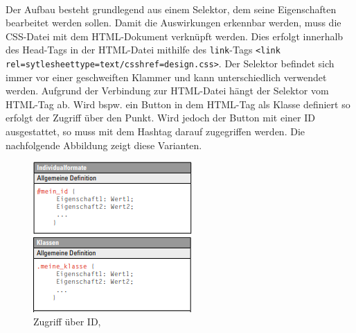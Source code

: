 \documentclass[a4paper,titlepage,halfparskip,12pt]{scrreprt}
\begin{document}
\begin{onehalfspacing}
\\Der Aufbau besteht grundlegend aus einem Selektor, dem seine Eigenschaften bearbeitet werden sollen. Damit die Auswirkungen erkennbar werden, muss die \ac{CSS}-Datei mit dem HTML-Dokument verknüpft werden. Dies erfolgt innerhalb des Head-Tags in der \ac{HTML}-Datei mithilfe des \texttt{link}-Tags \texttt{<link rel=\dq sytlesheet\dq \;type=\dq text/css\dq \;href=\dq design.css\dq>}. Der Selektor befindet sich immer vor einer geschweiften Klammer und kann unterschiedlich verwendet werden. Aufgrund der Verbindung zur HTML-Datei hängt der Selektor vom \ac{HTML}-Tag ab. Wird bspw. ein Button in dem \ac{HTML}-Tag als Klasse definiert so erfolgt der Zugriff über den Punkt. Wird jedoch der Button mit einer ID ausgestattet, so muss mit dem Hashtag darauf zugegriffen werden. Die nachfolgende Abbildung zeigt diese Varianten.
\begin{figure}[h]
	\begin{minipage}[c]{.4\textwidth}
		\includegraphics[width=\textwidth]{images/CSSID}
		\caption{Zugriff über ID, \cite{buhler2017html5}} 
		\label{img:CSSID}
	\end{minipage}
	\hspace{.1\linewidth}%
	\begin{minipage}[c]{.4\textwidth}
		\includegraphics[width=\textwidth]{images/CSSKlasse}

\end{minipage}
\end{figure}
\end{onehalfspacing}
\end{document}
